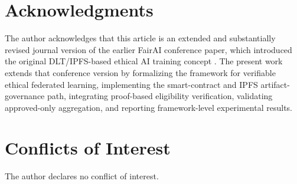 \documentclass[futureinternet,article,submit,pdftex,moreauthors]{Definitions/mdpi}
\begin{document}
\section*{Acknowledgments}

The author acknowledges that this article is an extended and substantially revised journal version of the earlier FairAI conference paper, which introduced the original DLT/IPFS-based ethical AI training concept \cite{intro_15}. The present work extends that conference version by formalizing the framework for verifiable ethical federated learning, implementing the smart-contract and IPFS artifact-governance path, integrating proof-based eligibility verification, validating approved-only aggregation, and reporting framework-level experimental results.

\section*{Conflicts of Interest}

The author declares no conflict of interest.
\end{document}
